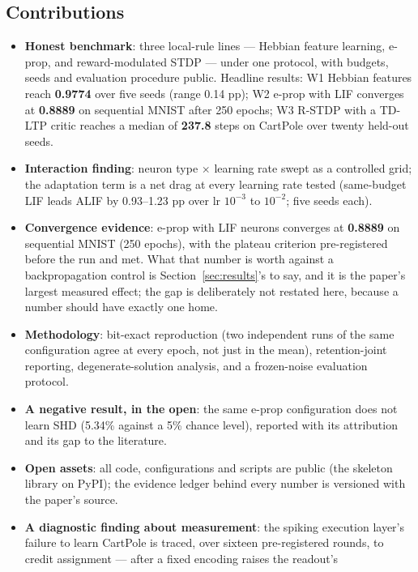 \documentclass[11pt]{article}
\begin{document}
\subsection{Contributions}
\begin{itemize}
  \item \textbf{Honest benchmark}: three local-rule lines --- Hebbian feature
    learning, e-prop, and reward-modulated STDP --- under one protocol, with
    budgets, seeds and evaluation procedure public. Headline results:
    W1 Hebbian features reach \textbf{0.9774} over five seeds (range 0.14 pp);
    W2 e-prop with LIF converges at \textbf{0.8889} on sequential MNIST after
    250 epochs; W3 R-STDP with a TD-LTP critic reaches a median of
    \textbf{237.8} steps on CartPole over twenty held-out seeds.
  \item \textbf{Interaction finding}: neuron type $\times$ learning rate swept as
    a controlled grid; the adaptation term is a net drag at every learning rate
    tested (same-budget LIF leads ALIF by 0.93--1.23 pp over lr $10^{-3}$ to
    $10^{-2}$; five seeds each).
  \item \textbf{Convergence evidence}: e-prop with LIF neurons converges at
    \textbf{0.8889} on sequential MNIST (250 epochs), with the plateau criterion
    pre-registered before the run and met. What that number is worth against a
    backpropagation control is Section~\ref{sec:results}'s to say, and it is the
    paper's largest measured effect; the gap is deliberately not restated here,
    because a number should have exactly one home.
  \item \textbf{Methodology}: bit-exact reproduction (two independent runs of the
    same configuration agree at every epoch, not just in the mean),
    retention-joint reporting, degenerate-solution analysis, and a frozen-noise
    evaluation protocol.
  \item \textbf{A negative result, in the open}: the same e-prop configuration
    does not learn SHD (5.34\% against a 5\% chance level), reported with its
    attribution and its gap to the literature.
  \item \textbf{Open assets}: all code, configurations and scripts are public
    (the skeleton library on PyPI); the evidence ledger behind every number is
    versioned with the paper's source.
  \item \textbf{A diagnostic finding about measurement}: the spiking execution
    layer's failure to learn CartPole is traced, over sixteen pre-registered
    rounds, to credit assignment --- after a fixed encoding raises the readout's

\end{itemize}
\end{document}

